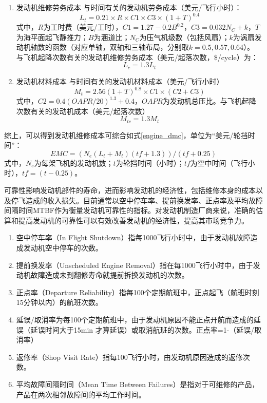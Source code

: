 \documentclass[12pt,a4paper]{report}
\begin{document}
\begin{enumerate}
\item 发动机维修劳务成本
与时间有关的发动机劳务成本（美元/飞行小时）：
\begin{equation}
L_t=0.21\times R\times C1\times C3\times(1+T)^{0.4}	
\label{engine_dmc_time}
\end{equation}
式中，$R$为工时费（美元/工时），$C1=1.27-0.2B^{0.2}$，$C3=0.032N_C+k$，$T$为海平面起飞静推力；$B$为涵道比；$N_C$为压气机级数（包括风扇）；$k$为涡扇发动机轴数的函数（对应单轴，双轴和三轴布局，分别取$k=0.5,0.57, 0.64$）。
与飞机起降次数有关的发动机维修劳务成本（美元/起落次数，\$/cycle）为：
\begin{equation}
L_c=1.3L_t	
\end{equation}

\item 发动机材料成本
与时间有关的发动机材料成本（美元/飞行小时）
\begin{equation}
M_t=2.56(1+T)^{0.8}\times  C1\times (C2+C3)	
\end{equation}
式中，$C2=0.4(OAPR/20)^{1.3}+0.4$，$OAPR$为发动机总压比。与飞机起降次数有关的发动机成本（美元/起落次数）
\begin{equation}
M_{tc}=1.3M_t	
\label{engine_dmc_mat}
\end{equation}

\end{enumerate}

综上，可以得到发动机维修成本可综合如式\ref{engine_dmc}，单位为“美元/轮挡时间”：
\begin{equation}
EMC=(N_e(L_t+M_t)(tf+1.3))/(tf+0.25)   
\label{engine_dmc}	
\end{equation} 
式中，$N_e$为每架飞机的发动机数；$t$为轮挡时间（小时）；$tf$为空中时间（飞行小时），$tf=(t-0.25)$。

可靠性影响发动机部件的寿命，进而影响发动机的经济性，包括维修本身的成本以及停飞造成的收入损失。目前通常以空中停车率、提前换发率、正点率及平均故障间隔时间MTBF作为衡量发动机可靠性的指标。对发动机制造厂商来说，准确的估算和提高发动机的可靠性可以有效改善发动机的经济性，提高其市场竞争力。

\begin{enumerate}
\item 空中停车率（In Flight Shutdown）指每1000飞行小时中，由于发动机故障造成发动机空中停车的次数。
\item 提前换发率（Unscheduled Engine Removal）指在每1000飞行小时中，由于发动机故障造成未到翻修寿命就提前拆换发动机的次数。
\item 正点率（Departure Reliability）指每100个定期航班中，正点起飞（航班时刻15分钟以内）的航班次数。
\item 延误/取消率为每100个定期航班中，由于发动机原因不能正点开航而造成的延误（延误时间大于15min 才算延误）或取消航班的次数。正点率=1-（延误/取消率）
\item 返修率（Shop Visit Rate）指每100飞行小时，由发动机原因造成的返修次数。
\item 平均故障间隔时间（Mean Time Between Failures）是指对于可维修的产品，产品在两次相邻故障间的平均工作时间。
\end{enumerate}
\end{document}
